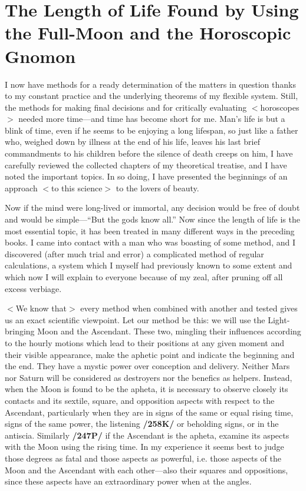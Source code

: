 \section{The Length of Life Found by Using the Full-Moon and the Horoscopic Gnomon}

I now have methods for a ready determination of the matters in question thanks to my constant practice and the underlying theorems of my flexible system. Still, the methods for making final decisions and for critically evaluating $<$horoscopes$>$ needed more time—and time has become short for me. Man’s life is but a blink of time, even if he seems to be enjoying a long lifespan, so just like a father who, weighed down by illness at the end of his life, leaves his last brief commandments to his children before the silence of death creeps on him, I have carefully reviewed the collected chapters of my theoretical treatise, and I have noted the important topics. In so doing, I have presented the beginnings of an approach $<$to this science$>$ to the lovers of beauty.

Now if the mind were long-lived or immortal, any decision would be free of doubt and would be simple—“But the gods know all.” Now since the length of life is the most essential topic, it has been treated in many different ways in the preceding books. I came into contact with a man who was boasting of some method, and I discovered (after much trial and error) a complicated method of regular calculations, a system which I myself had previously known to some extent and which now I will explain to everyone because of my zeal, after pruning off all excess verbiage. 

$<$We know that$>$ every method when combined with another and tested gives us an exact scientific viewpoint. Let our method be this: we will use the Light-bringing Moon and the Ascendant. These two,
mingling their influences according to the hourly motions which lead to their positions at any given moment and their visible appearance, make the aphetic point and indicate the beginning and the end. They have a mystic power over conception and delivery. Neither Mars nor Saturn will be considered as destroyers nor the benefics as helpers. Instead, when the Moon is found to be the apheta, it is necessary to observe closely its contacts and its sextile, square, and opposition aspects with respect to the Ascendant, particularly when they are in signs of the same or equal rising time, signs of the same power, the listening \textbf{/258K/} or beholding signs, or in the antiscia. Similarly \textbf{/247P/} if the Ascendant is the apheta, examine its aspects with the Moon using the rising time. In my experience it seems best to judge those degrees as fatal and those aspects as powerful, i.e. those aspects of the Moon and the Ascendant with each other—also their squares and oppositions, since these aspects have an extraordinary power when at the angles.

